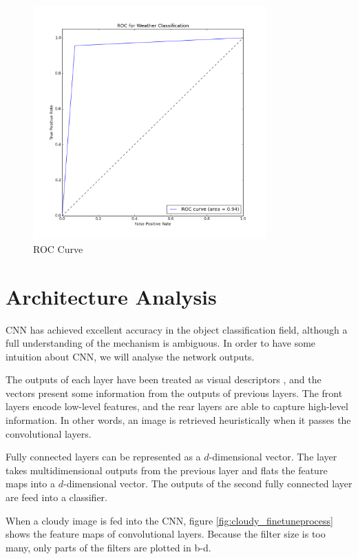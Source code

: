 \begin{figure}[!htb]
    \centering
	\includegraphics[width=0.8\textwidth]{ROCWeatherClassification.png}
    \caption{ROC Curve}%
    \label{fig:WeatherClassificationROC}%
\end{figure}

\section{Architecture Analysis}

CNN has achieved excellent accuracy in the object classification field, although a full understanding of the mechanism is ambiguous. In order to have some intuition about CNN, we will analyse the network outputs.

The outputs of each layer have been treated as visual descriptors \citep{razavian2014cnn}, and the vectors present some information from the outputs of previous layers. The front layers encode low-level features, and the rear layers are able to capture high-level information. In other words, an image is retrieved heuristically when it passes the convolutional layers.

Fully connected layers can be represented as a $d$-dimensional vector. The layer takes multidimensional outputs from the previous layer and flats the feature maps into a $d$-dimensional vector. The outputs of the second fully connected layer are feed into a classifier.

When a cloudy image is fed into the CNN, figure \ref{fig:cloudy_finetuneprocess} shows the feature maps of convolutional layers. Because the filter size is too many, only parts of the filters are plotted in b-d.

